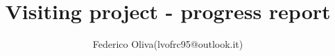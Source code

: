 \documentclass[10pt]{article}
\begin{document}
\setlength\parindent{0pt}

\title{Visiting project - progress report}
\author{Federico Oliva(lvofrc95@outlook.it)}
        
\maketitle
\renewcommand*\contentsname{{}}

\tableofcontents





\newpage
{\small


}
\end{document}
